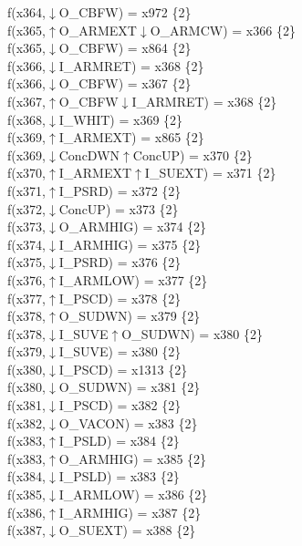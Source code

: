 f(x364,$\downarrow$O\_CBFW) = x972 \{2\} \\  
f(x365,$\uparrow$O\_ARMEXT$\downarrow$O\_ARMCW) = x366 \{2\} \\  
f(x365,$\downarrow$O\_CBFW) = x864 \{2\} \\  
f(x366,$\downarrow$I\_ARMRET) = x368 \{2\} \\  
f(x366,$\downarrow$O\_CBFW) = x367 \{2\} \\  
f(x367,$\uparrow$O\_CBFW$\downarrow$I\_ARMRET) = x368 \{2\} \\  
f(x368,$\downarrow$I\_WHIT) = x369 \{2\} \\  
f(x369,$\uparrow$I\_ARMEXT) = x865 \{2\} \\  
f(x369,$\downarrow$ConcDWN$\uparrow$ConcUP) = x370 \{2\} \\  
f(x370,$\uparrow$I\_ARMEXT$\uparrow$I\_SUEXT) = x371 \{2\} \\  
f(x371,$\uparrow$I\_PSRD) = x372 \{2\} \\  
f(x372,$\downarrow$ConcUP) = x373 \{2\} \\  
f(x373,$\downarrow$O\_ARMHIG) = x374 \{2\} \\  
f(x374,$\downarrow$I\_ARMHIG) = x375 \{2\} \\  
f(x375,$\downarrow$I\_PSRD) = x376 \{2\} \\  
f(x376,$\uparrow$I\_ARMLOW) = x377 \{2\} \\  
f(x377,$\uparrow$I\_PSCD) = x378 \{2\} \\  
f(x378,$\uparrow$O\_SUDWN) = x379 \{2\} \\  
f(x378,$\downarrow$I\_SUVE$\uparrow$O\_SUDWN) = x380 \{2\} \\  
f(x379,$\downarrow$I\_SUVE) = x380 \{2\} \\  
f(x380,$\downarrow$I\_PSCD) = x1313 \{2\} \\  
f(x380,$\downarrow$O\_SUDWN) = x381 \{2\} \\  
f(x381,$\downarrow$I\_PSCD) = x382 \{2\} \\  
f(x382,$\downarrow$O\_VACON) = x383 \{2\} \\  
f(x383,$\uparrow$I\_PSLD) = x384 \{2\} \\  
f(x383,$\uparrow$O\_ARMHIG) = x385 \{2\} \\  
f(x384,$\downarrow$I\_PSLD) = x383 \{2\} \\  
f(x385,$\downarrow$I\_ARMLOW) = x386 \{2\} \\  
f(x386,$\uparrow$I\_ARMHIG) = x387 \{2\} \\  
f(x387,$\downarrow$O\_SUEXT) = x388 \{2\} \\  
